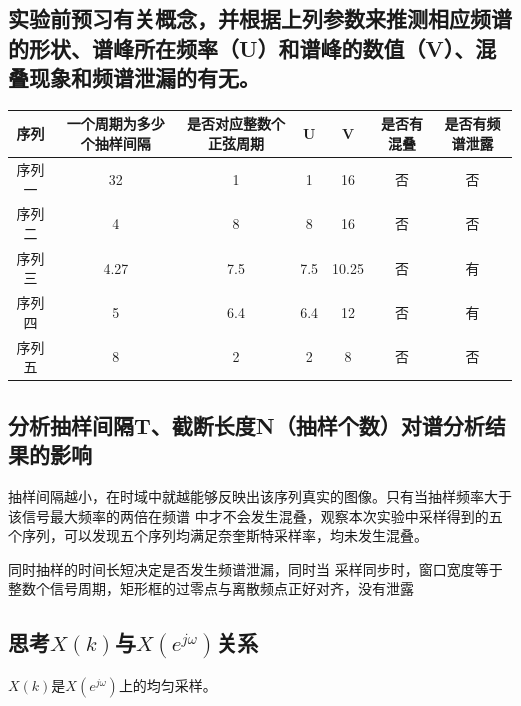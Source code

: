 \documentclass{../source/zjureport}
\begin{document}
        \subsection{实验前预习有关概念，并根据上列参数来推测相应频谱的形状、谱峰所在频率（U）和谱峰的数值（V）、混叠现象和频谱泄漏的有无。}
        \begin{table}[H]
            \begin{tabular}{|c|c|c|c|c|c|c|}
            \hline
            \textbf{序列} & \textbf{一个周期为多少个抽样间隔} & \textbf{是否对应整数个正弦周期} & \textbf{U} & V     & 是否有混叠 & 是否有频谱泄露 \\ \hline
            序列一         & 32                    & 1                    & 1          & 16    & 否     & 否       \\ \hline
            序列二         & 4                     & 8                    & 8          & 16    & 否     & 否       \\ \hline
            序列三         & 4.27                  & 7.5                  & 7.5        & 10.25 & 否     & 有       \\ \hline
            序列四         & 5                     & 6.4                  & 6.4        & 12    & 否     & 有       \\ \hline
            序列五         & 8                     & 2                    & 2          & 8     & 否     & 否       \\ \hline
            \end{tabular}
            \end{table}

        \subsection{分析抽样间隔T、截断长度N（抽样个数）对谱分析结果的影响}
            抽样间隔越小，在时域中就越能够反映出该序列真实的图像。只有当抽样频率大于该信号最大频率的两倍在频谱
            中才不会发生混叠，观察本次实验中采样得到的五个序列，可以发现五个序列均满足奈奎斯特采样率，均未发生混叠。


            同时抽样的时间长短决定是否发生频谱泄漏，同时当
            采样同步时，窗口宽度等于整数个信号周期，矩形框的过零点与离散频点正好对齐，没有泄露

        \subsection{思考$X(k)$与$X(e^{j\omega})$关系}
            $X(k)$是$X(e^{j\omega})$上的均匀采样。
\end{document}

